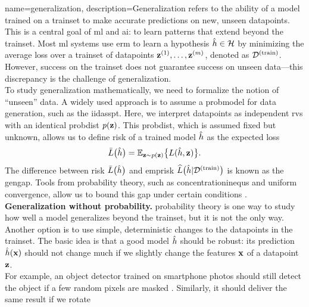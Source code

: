 {name={generalization}, 
	description={Generalization refers to the ability of a \gls{model} trained on a \gls{trainset} to make accurate 
		\gls{prediction}s on new, unseen \gls{datapoint}s. This is a central goal of \gls{ml} and \gls{ai}: 
		to learn patterns that extend beyond the \gls{trainset}. Most \gls{ml} systems 
		use \gls{erm} to learn a \gls{hypothesis} $\hat{h} \in \mathcal{H}$ by minimizing 
		the average \gls{loss} over a \gls{trainset} of \gls{datapoint}s ${\bf z}^{(1)}, \ldots, {\bf z}^{(m)}$, 
		denoted as $\mathcal{D}^{(\rm train)}$. However, success on the \gls{trainset} does not guarantee success on 
		unseen \gls{data}—this discrepancy is the challenge of generalization. \\ To study generalization 
		mathematically, we need to formalize the notion of ``unseen'' \gls{data}. A widely used 
		approach is to assume a \gls{probmodel} for \gls{data} generation, such as the \gls{iidasspt}. 
		Here, we interpret \gls{datapoint}s as independent \gls{rv}s with an identical 
		\gls{probdist} $p({\bf z})$. This \gls{probdist}, which is assumed fixed but unknown, 
		allows us to define \gls{risk} of a trained \gls{model} $\hat{h}$ as the expected \gls{loss}
		\[
		\bar{L} \big( \hat{h} \big)=\mathbb{E}_{{\bf z} \sim p({\bf z})} \big\{ L(\hat{h}, {\bf z}) \big\}.
		\]
		The difference between \gls{risk} $\bar{L} \big( \hat{h} \big)$ and \gls{emprisk} $\widehat{L}\big(\hat{h}|\mathcal{D}^{(\rm train)}\big)$ 
		is known as the \gls{gengap}. Tools from \gls{probability} theory, such as \gls{concentrationinequ}s 
		and uniform convergence, allow us to bound this gap under certain conditions \cite{ShalevMLBook}.\\
		{\bf Generalization without \gls{probability}.} \Gls{probability} theory is one way to study how well a 
		\gls{model} generalizes beyond the \gls{trainset}, but it is not the only way. Another option is to use 
		simple, deterministic changes to the \gls{datapoint}s in the \gls{trainset}. The basic idea is that a 
		good \gls{model} $\hat{h}$ should be robust: its \gls{prediction} $\hat{h}({\bf x})$ 
		should not change much if we slightly change the \gls{feature}s ${\bf x}$ of a \gls{datapoint} ${\bf z}$. 
		\\[1mm] For example, an object detector trained on smartphone photos should still detect the object if a few 
		random pixels are masked \cite{OnePixelAttack}. Similarly, it should deliver the same result if we rotate 
}}
